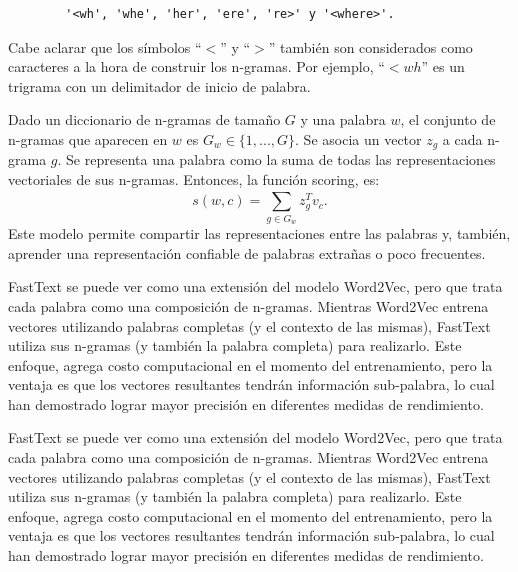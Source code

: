 \begin{center}\ttfamily{}%
	\begin{minipage}{45\wd0}%
		\begin{verbatim}
		'<wh', 'whe', 'her', 'ere', 're>' y '<where>'.
		\end{verbatim}
	\end{minipage}
\end{center}

Cabe aclarar que los símbolos ``\(<\)'' y ``\(>\)'' también son considerados como caracteres a la hora de construir los n-gramas. Por ejemplo, ``\(<wh\)'' es un trigrama con un delimitador de inicio de palabra.

\bigskip Dado un diccionario de n-gramas de tamaño \(G\) y una palabra \(w\), el conjunto de n-gramas que aparecen en \(w\) es \(G_w \in \{1,..., G\}\). Se asocia un vector \(z_g\) a cada n-grama \(g\). Se representa una palabra como la suma de todas las representaciones vectoriales de sus n-gramas. Entonces, la función scoring, es:
\[s(w,c) = \sum_{g \in G_w}^{}{}z_g^T v_c.\]
Este modelo permite compartir las representaciones entre las palabras y, también, aprender una representación confiable de palabras extrañas o poco frecuentes.

\bigskip FastText se puede ver como una extensión del modelo Word2Vec, pero que trata cada palabra como una composición de n-gramas. Mientras Word2Vec entrena vectores utilizando palabras completas (y el contexto de las mismas), FastText utiliza sus n-gramas (y también la palabra completa) para realizarlo. Este enfoque, agrega costo computacional en el momento del entrenamiento, pero la ventaja es que los vectores resultantes tendrán información sub-palabra, lo cual han demostrado lograr mayor precisión en diferentes medidas de rendimiento.

\bigskip FastText se puede ver como una extensión del modelo Word2Vec, pero que trata cada palabra como una composición de n-gramas. Mientras Word2Vec entrena vectores utilizando palabras completas (y el contexto de las mismas), FastText utiliza sus n-gramas (y también la palabra completa) para realizarlo. Este enfoque, agrega costo computacional en el momento del entrenamiento, pero la ventaja es que los vectores resultantes tendrán información sub-palabra, lo cual han demostrado lograr mayor precisión en diferentes medidas de rendimiento.

